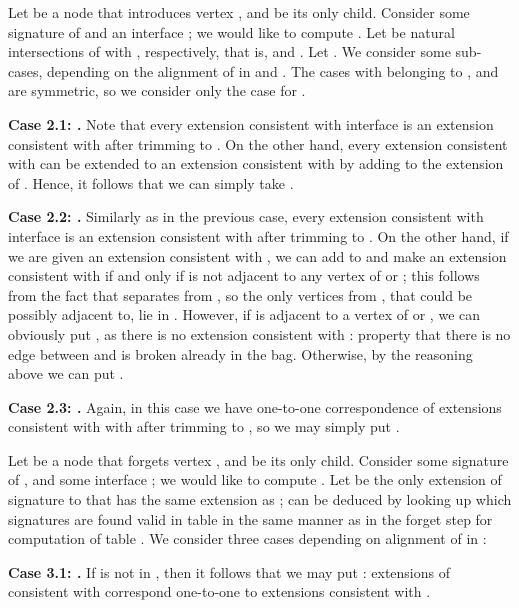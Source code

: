 \documentclass[a4paper,11pt]{article}
\theoremstyle{definition}
\theoremstyle{remark}
\begin{document}
 Let  be a node that
introduces vertex , and  be its only child.  Consider some
signature  of  and an interface
; we would like to compute
.  Let  be natural intersections
of  with , respectively, that is,  and .  Let .  We consider
some sub-cases, depending on the alignment of  in  and .
The cases with  belonging to ,  and  are symmetric,
so we consider only the case for .

\vskip 0.1cm {\bf{Case 2.1: .}} Note that every extension
consistent with interface  is an extension consistent with
 after trimming to .  On the other hand, every extension
consistent with  can be extended to an extension consistent
with  by adding  to the extension of .  Hence, it follows
that we can simply take .

\vskip 0.1cm {\bf{Case 2.2: .}} Similarly as in the previous
case, every extension consistent with interface  is an extension
consistent with  after trimming to .  On the other hand,
if we are given an extension consistent with , we can add 
to  and make an extension consistent with  if and only if
 is not adjacent to any vertex of  or ; this follows from
the fact that  separates  from , so the only vertices
from ,  that  could be possibly adjacent
to, lie in .  However, if  is adjacent to a vertex of  or
, we can obviously put , as there is no extension
consistent with : property that there is no edge between
 and  is broken already in the
bag.  Otherwise, by the reasoning above we can put .

\vskip 0.1cm

{\bf{Case 2.3: .}} Again, in this case we have
one-to-one correspondence of extensions consistent with  with
 after trimming to , so we may simply put .

\vskip 0.3cm

 Let  be a node that forgets
vertex , and  be its only child.  Consider some signature
 of , and some interface
; we would like to compute
.  Let  be the only extension of 
signature  to  that has the same extension as
;  can be deduced by looking up which signatures are
found valid in table  in the same manner as in the forget step for
computation of table .  We consider three cases depending on
alignment of  in :

\vskip 0.1cm {\bf{Case 3.1: .}} If  is not in , then it follows that we may put :
extensions of  consistent with  correspond one-to-one to
extensions consistent with .
\end{document}

